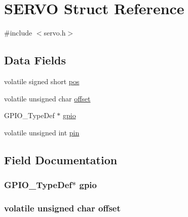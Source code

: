 \hypertarget{struct_s_e_r_v_o}{}\section{S\+E\+R\+V\+O Struct Reference}
\label{struct_s_e_r_v_o}


{\ttfamily \#include $<$servo.\+h$>$}

\subsection*{Data Fields}
\begin{DoxyCompactItemize}
\item 
volatile signed short \hyperlink{struct_s_e_r_v_o_a39409ea333d7ec5a82aef932f30f8867}{pos}
\item 
volatile unsigned char \hyperlink{struct_s_e_r_v_o_a13d0f87fe22730307fb653c5370d062b}{offset}
\item 
G\+P\+I\+O\+\_\+\+Type\+Def $\ast$ \hyperlink{struct_s_e_r_v_o_a9d9aec8d08779b9692169a2f5b3281e0}{gpio}
\item 
volatile unsigned int \hyperlink{struct_s_e_r_v_o_a57e96ac52d84e279b207515b0f55ec85}{pin}
\end{DoxyCompactItemize}


\subsection{Field Documentation}
\hypertarget{struct_s_e_r_v_o_a9d9aec8d08779b9692169a2f5b3281e0}{}
\subsubsection[{gpio}]{\setlength{\rightskip}{0pt plus 5cm}G\+P\+I\+O\+\_\+\+Type\+Def$\ast$ gpio}\label{struct_s_e_r_v_o_a9d9aec8d08779b9692169a2f5b3281e0}
\hypertarget{struct_s_e_r_v_o_a13d0f87fe22730307fb653c5370d062b}{}
\subsubsection[{offset}]{\setlength{\rightskip}{0pt plus 5cm}volatile unsigned char offset}\label{struct_s_e_r_v_o_a13d0f87fe22730307fb653c5370d062b}
\hypertarget{struct_s_e_r_v_o_a57e96ac52d84e279b207515b0f55ec85}{}
